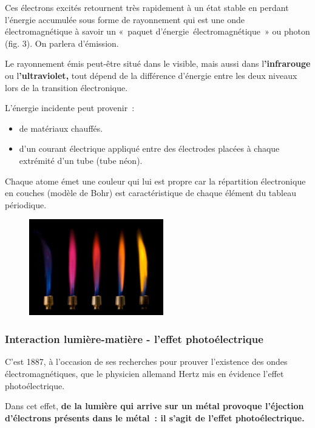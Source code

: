 Ces électrons excités retournent très rapidement à un état stable en
perdant l'énergie accumulée sous forme de rayonnement qui est une onde
électromagnétique à savoir un «~paquet d'énergie~électromagnétique~» ou
photon (fig. 3). On parlera d'émission.

Le rayonnement émis peut-être situé dans le visible, mais aussi dans
l\textbf{\textbf{'}\textbf{infrarouge} }ou\textbf{
}l\textbf{\textbf{'ultraviolet}, }tout dépend de la différence d'énergie
entre les deux niveaux lors de la transition électronique.

L'énergie incidente peut provenir~:

\begin{itemize}

\item
  de matériaux chauffés.
\item
  d'un courant électrique appliqué entre des électrodes placées à chaque
  extrémité d'un tube (tube néon).
\end{itemize}

Chaque atome émet une couleur qui lui est propre car la répartition
électronique en couches (modèle de Bohr) est caractéristique de chaque
élément du tableau périodique.

\begin{figure}
\centering
\includegraphics[width=5.856cm,height=4.186cm]{Pictures/10000000000001F4000001658D0506E7D72323B2.jpg}
\caption{}
\end{figure}
\subsubsection{Interaction lumière-matière - l'effet photoélectrique}

C'est 1887, à l'occasion de ses recherches pour prouver l'existence des
ondes électromagnétiques, que le physicien allemand Hertz mis en
évidence l'effet photoélectrique.

Dans cet effet, \textbf{de la lumière qui arrive sur un métal provoque
l'éjection d'électrons présents dans le métal~: il s'agit de l'effet
photoélectrique. }

